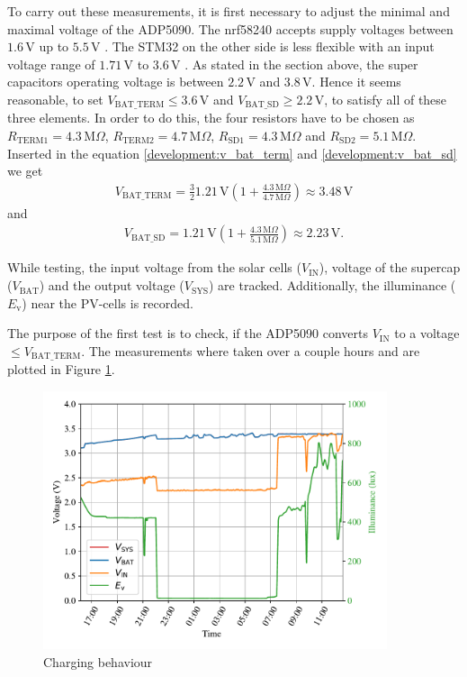 To carry out these measurements, it is first necessary to adjust the minimal and maximal voltage of the ADP5090.
The nrf58240 accepts supply voltages between $1.6\,\text{V}$ up to $5.5\,\text{V}$ \cite{nrf}.
The STM32 on the other side is less flexible with an input voltage range of $1.71\,\text{V}$ to $3.6\,\text{V}$ \cite{stm32}.
As stated in the section above, the super capacitors operating voltage is between $2.2\,\text{V}$ and $3.8\,\text{V}$.
Hence it seems reasonable, to set $V_{\text{BAT\_TERM}} \le 3.6\,\text{V}$ and $V_{\text{BAT\_SD}} \ge 2.2\,\text{V}$, to satisfy all of these three elements.
In order to do this, the four resistors have to be chosen as $R_{\text{TERM1}} = 4.3\,\text{M}\Omega$, $R_{\text{TERM2}} = 4.7\,\text{M}\Omega$, $R_{\text{SD1}} = 4.3\,\text{M}\Omega$ and $R_{\text{SD2}} = 5.1\,\text{M}\Omega$.
Inserted in the equation \eqref{development:v_bat_term} and \eqref{development:v_bat_sd} we get
\begin{align}
	V_{\text{BAT\_TERM}}= \frac{3}{2} 1.21\,\text{V} \left(1 + \frac{4.3\,\text{M}\Omega}{4.7 \,\text{M}\Omega} \right) \approx 3.48\,\text{V} 
\end{align}
and
\begin{align}
	V_{\text{BAT\_SD}} = 1.21\,\text{V} \left(1 + \frac{4.3\,\text{M}\Omega}{5.1\,\text{M}\Omega} \right) \approx 2.23\,\text{V}. 
\end{align}

While testing, the input voltage from the solar cells ($V_{\text{IN}}$), voltage of the supercap ($V_{\text{BAT}}$) and the output voltage ($V_{\text{SYS}}$) are tracked. Additionally, the illuminance ($E_\text{v}$) near the PV-cells  is recorded.

The purpose of the first test is to check, if the ADP5090 converts $V_{\text{IN}}$ to a voltage $\le V_{\text{BAT\_TERM}}$.
The measurements where taken over a couple hours and are plotted in Figure \ref{development:charge}.

\begin{figure}[ht]
	\centering
	\includegraphics[width=0.9\textwidth]{4-development/hardware/graphics/laden.pdf}
	\caption{Charging behaviour\label{development:charge}}
\end{figure}

